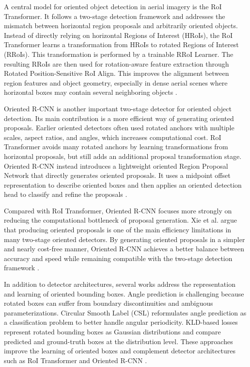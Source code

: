 A central model for oriented object detection in aerial imagery is the RoI Transformer. It follows a two-stage detection framework and addresses the mismatch between horizontal region proposals and arbitrarily oriented objects. Instead of directly relying on horizontal Regions of Interest (HRoIs), the RoI Transformer learns a transformation from HRoIs to rotated Regions of Interest (RRoIs). This transformation is performed by a trainable RRoI Learner. The resulting RRoIs are then used for rotation-aware feature extraction through Rotated Position-Sensitive RoI Align. This improves the alignment between region features and object geometry, especially in dense aerial scenes where horizontal boxes may contain several neighboring objects \cite{ding2018learning}.

Oriented R-CNN is another important two-stage detector for oriented object detection. Its main contribution is a more efficient way of generating oriented proposals. Earlier oriented detectors often used rotated anchors with multiple scales, aspect ratios, and angles, which increases computational cost. RoI Transformer avoids many rotated anchors by learning transformations from horizontal proposals, but still adds an additional proposal transformation stage. Oriented R-CNN instead introduces a lightweight oriented Region Proposal Network that directly generates oriented proposals. It uses a midpoint offset representation to describe oriented boxes and then applies an oriented detection head to classify and refine the proposals \cite{xie2021oriented}.

Compared with RoI Transformer, Oriented R-CNN focuses more strongly on reducing the computational bottleneck of proposal generation. Xie et al. argue that producing oriented proposals is one of the main efficiency limitations in many two-stage oriented detectors. By generating oriented proposals in a simpler and nearly cost-free manner, Oriented R-CNN achieves a better balance between accuracy and speed while remaining compatible with the two-stage detection framework \cite{xie2021oriented}.

In addition to detector architectures, several works address the representation and learning of oriented bounding boxes. Angle prediction is challenging because rotated boxes can suffer from boundary discontinuities and ambiguous parameterizations. Circular Smooth Label (CSL) reformulates angle prediction as a classification problem to better handle angular periodicity. KLD-based losses represent rotated bounding boxes as Gaussian distributions and compare predicted and ground-truth boxes at the distribution level. These approaches improve the learning of oriented boxes and complement detector architectures such as RoI Transformer and Oriented R-CNN \cite{yang2022arbitrary,yang2021learning}.

